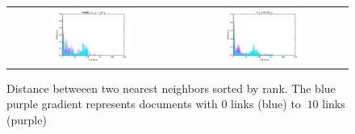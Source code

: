 \begin{figure}[h!]
\begin{tabular}{cc}
\includegraphics[width =0.5\textwidth]{images/thresh_cosine_simple_tag_similarity_distances} 	& \includegraphics[width =0.5\textwidth]{images/thresh_cosine_tag_smoothing_distances}
\end{tabular}
\caption{Distance betweeen two nearest neighbors sorted by rank. The blue purple gradient represents documents with 0 links (blue) to $\>10$ links (purple)}
\label{fig:thresholds_differences}
\end{figure}


